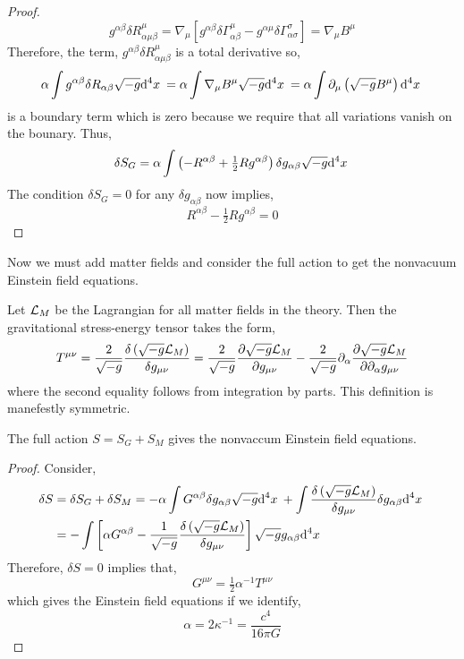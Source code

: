 \documentclass[11pt, a4paper]{article}
\begin{document}
\begin{proof}
\[ g^{\alpha \beta} \delta R^\mu_{\alpha \mu \beta} = \nabla_\mu \left[ g^{\alpha \beta} \delta \Gamma^\mu_{\alpha \beta} - g^{\alpha \mu} \delta \Gamma^\sigma_{\alpha \sigma} \right] = \nabla_\mu B^\mu \]
Therefore, the term, $g^{\alpha \beta} \delta R^\mu_{\alpha \mu \beta}$ is a total derivative so,
\[ \alpha \int g^{\alpha \beta} \delta R_{\alpha \beta} \sqrt{-g} \mathrm{d}^{4} x \: = \alpha \int \nabla_\mu B^\mu \sqrt{-g} \mathrm{d}^{4} x \: = \alpha \int \partial_\mu \left( \sqrt{-g} B^\mu \right) \mathrm{d}^{4} x \:  \]
is a boundary term which is zero because we require that all variations vanish on the bounary. 
Thus,
\[ \delta S_G = \alpha \int \left( - R^{\alpha \beta} + \tfrac{1}{2} R g^{\alpha \beta} \right) \delta g_{\alpha \beta} \sqrt{-g} \mathrm{d}^{4} x \: \]
The condition $\delta S_G = 0$ for any $\delta g_{\alpha \beta}$ now implies,
\[  R^{\alpha \beta} - \tfrac{1}{2} R g^{\alpha \beta}  = 0 \]
\end{proof}

\begin{remark}
Now we must add matter fields and consider the full action to get the nonvacuum Einstein field equations.
\end{remark}

\begin{definition}
Let $\mathcal{L}_{M}$ be the Lagrangian for all matter fields in the theory. Then the gravitational stress-energy tensor takes the form,
\[ T^{\mu \nu} = \frac{2}{\sqrt{-g}} \frac{\delta \left(\sqrt{-g} \mathcal{L}_M \right)}{\delta g_{\mu \nu}} = \frac{2}{\sqrt{-g}} \frac{\partial{\sqrt{-g} \mathcal{L}_M}}{\partial{g_{\mu \nu}}} - \frac{2}{\sqrt{-g}} \partial_\alpha \frac{\partial{\sqrt{-g} \mathcal{L}_M}}{\partial{ \partial_\alpha g_{\mu \nu}}} \] 
where the second equality follows from integration by parts. This definition is manefestly symmetric. 
\end{definition}

\begin{theorem}
The full action $S = S_G + S_M$ gives the nonvaccum Einstein field equations.
\end{theorem}

\begin{proof}
Consider,
\begin{align*}
\delta S & = \delta S_G + \delta S_M = - \alpha \int G^{\alpha \beta} \delta g_{\alpha \beta} \sqrt{-g} \mathrm{d}^{4} x \: + \int \frac{\delta \left(\sqrt{-g} \mathcal{L}_M \right)}{\delta g_{\mu \nu}} \delta g_{\alpha \beta} \mathrm{d}^{4} x \:
\\
& = -\int \left[ \alpha G^{\alpha \beta} - \frac{1}{\sqrt{-g}} \frac{\delta \left(\sqrt{-g} \mathcal{L}_M \right)}{\delta g_{\mu \nu}} \right] \sqrt{-g} g_{\alpha \beta} \mathrm{d}^{4} x \:  
\end{align*}
Therefore, $\delta S = 0$ implies that,
\[ G^{\mu \nu} = \tfrac{1}{2} \alpha^{-1} T^{\mu \nu} \]
which gives the Einstein field equations if we identify,
\[ \alpha = 2 \kappa^{-1} = \frac{c^4}{16 \pi G} \]
\end{proof}
\end{document}
